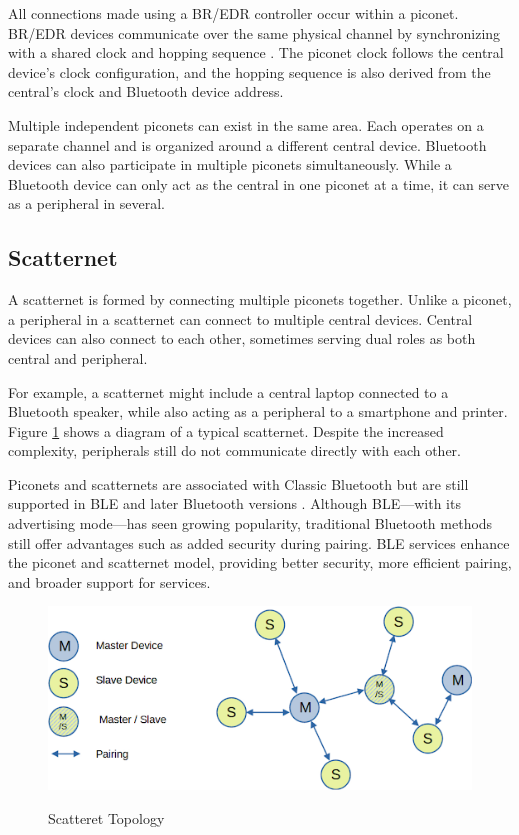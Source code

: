 All connections made using a BR/EDR controller occur within a piconet. BR/EDR devices communicate over the same physical channel by synchronizing with a shared clock and hopping sequence \cite{bluetoothcorespec6}. The piconet clock follows the central device's clock configuration, and the hopping sequence is also derived from the central’s clock and Bluetooth device address.

Multiple independent piconets can exist in the same area. Each operates on a separate channel and is organized around a different central device. Bluetooth devices can also participate in multiple piconets simultaneously. While a Bluetooth device can only act as the central in one piconet at a time, it can serve as a peripheral in several.


\subsection{Scatternet}

A scatternet is formed by connecting multiple piconets together. Unlike a piconet, a peripheral in a scatternet can connect to multiple central devices. Central devices can also connect to each other, sometimes serving dual roles as both central and peripheral.

For example, a scatternet might include a central laptop connected to a Bluetooth speaker, while also acting as a peripheral to a smartphone and printer. Figure \ref{fig:scatternet} shows a diagram of a typical scatternet. Despite the increased complexity, peripherals still do not communicate directly with each other.

Piconets and scatternets are associated with Classic Bluetooth but are still supported in BLE and later Bluetooth versions \cite{nextgenBLE}. Although BLE—with its advertising mode—has seen growing popularity, traditional Bluetooth methods still offer advantages such as added security during pairing. BLE services enhance the piconet and scatternet model, providing better security, more efficient pairing, and broader support for services.

\begin{figure}[h]
    \caption{Scatteret Topology}
    \includegraphics[scale=.7]{scatternet.png}
    \label{fig:scatternet}
    \end{figure}

